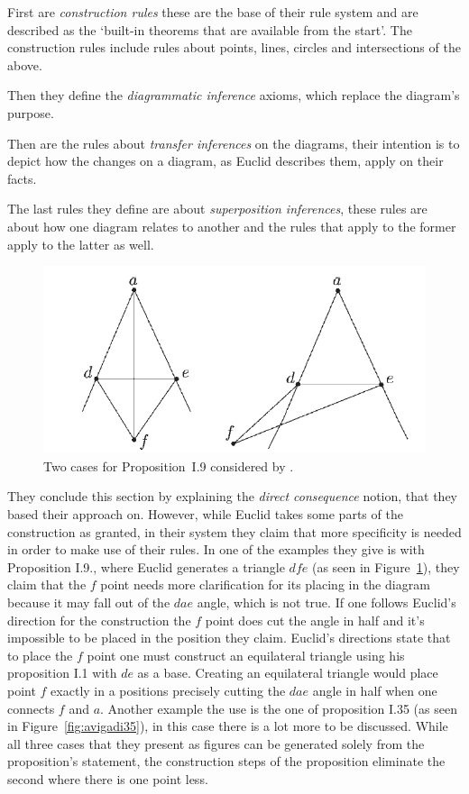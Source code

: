 \documentclass[]{interact}
\theoremstyle{plain}
\theoremstyle{definition}
\theoremstyle{remark}
\newcommand{\term}[1]{\emph{#1\/}}
\newcommand{\quotes}[1]{`#1'}
\begin{document}
First are \term{construction rules} these are the base of their rule
system and are described as the
\quotes{built-in theorems that are available from the start}.
The construction rules include rules about points, lines, circles and
intersections of the above.

Then they define the \term{diagrammatic inference} axioms, which
replace the diagram's purpose.

Then are the rules about \term{transfer inferences} on the diagrams,
their intention is to depict how the changes on a diagram, as Euclid
describes them, apply on their facts.

The last rules they define are about \term{superposition inferences},
these rules are about how one diagram relates to another and the rules
that apply to the former apply to the latter as well.


\begin{figure}[t]
  \centering
  \includegraphics[scale=0.5]{avigad-fig8-I9}
  \caption[Avigad et al Approach I.9]{Two cases for Proposition~I.9
    considered by \citet{AVIGAD2009}.}
  \label{fig:avigadi9}
\end{figure}


They conclude this section by explaining the \term{direct consequence}
notion, that they based their approach on. However, while Euclid takes
some parts of the construction as granted, in their system they claim
that more specificity is needed in order to make use of their rules.
In one of the examples they give is with Proposition I.9., where
Euclid generates a triangle $dfe$ (as seen in
Figure~\ref{fig:avigadi9}), they claim that the $f$ point needs more
clarification for its placing in the diagram because it may fall out
of the $dae$ angle, which is not true. If one follows Euclid's
direction for the construction the $f$ point does cut the angle in
half and it's impossible to be placed in the position they claim.
Euclid's directions state that to place the $f$ point one must
construct an equilateral triangle using his proposition I.1 with $de$
as a base. Creating an equilateral triangle would place point $f$
exactly in a positions precisely cutting the $dae$ angle in half when
one connects $f$ and $a$. Another example the use is the one of
proposition I.35 (as seen in Figure~\ref{fig:avigadi35}), in this case
there is a lot more to be discussed. While all three cases that they
present as figures can be generated solely from the proposition's
statement, the construction steps of the proposition eliminate the
second where there is one point less.
\end{document}
